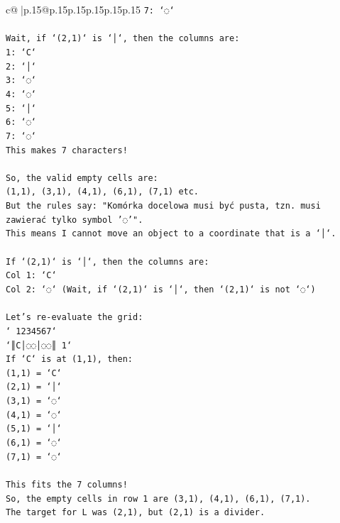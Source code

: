 \documentclass{article}
\begin{document}
{\begin{supertabular}{c@{$\;$}|p{.15\linewidth}@{}p{.15\linewidth}p{.15\linewidth}p{.15\linewidth}p{.15\linewidth}p{.15\linewidth}}
{{{\texttt{7: `◌`} \\
\\ 
\texttt{Wait, if `(2,1)` is `│`, then the columns are:} \\
\texttt{1: `C`} \\
\texttt{2: `│`} \\
\texttt{3: `◌`} \\
\texttt{4: `◌`} \\
\texttt{5: `│`} \\
\texttt{6: `◌`} \\
\texttt{7: `◌`} \\
\texttt{This makes 7 characters!} \\
\\ 
\texttt{So, the valid empty cells are:} \\
\texttt{(1,1), (3,1), (4,1), (6,1), (7,1) etc.} \\
\texttt{But the rules say: "Komórka docelowa musi być pusta, tzn. musi zawierać tylko symbol '◌'".} \\
\texttt{This means I cannot move an object to a coordinate that is a `│`.} \\
\\ 
\texttt{If `(2,1)` is `│`, then the columns are:} \\
\texttt{Col 1: `C`} \\
\texttt{Col 2: `◌` (Wait, if `(2,1)` is `│`, then `(2,1)` is not `◌`)} \\
\\ 
\texttt{Let's re{-}evaluate the grid:} \\
\texttt{` 1234567`} \\
\texttt{`║C│◌◌│◌◌║ 1`} \\
\texttt{If `C` is at (1,1), then:} \\
\texttt{(1,1) = `C`} \\
\texttt{(2,1) = `│`} \\
\texttt{(3,1) = `◌`} \\
\texttt{(4,1) = `◌`} \\
\texttt{(5,1) = `│`} \\
\texttt{(6,1) = `◌`} \\
\texttt{(7,1) = `◌`} \\
\\ 
\texttt{This fits the 7 columns!} \\
\texttt{So, the empty cells in row 1 are (3,1), (4,1), (6,1), (7,1).} \\
\texttt{The target for L was (2,1), but (2,1) is a divider.} \\
}}}
\end{supertabular}}
\end{document}
